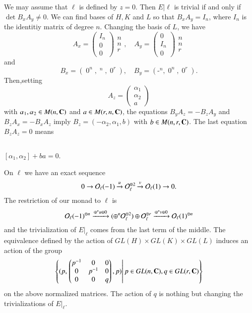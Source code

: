 We may assume that $\ell$ is defined by $z=0$. Then $E |\ell$ is trivial if and only if $\det B_{x}A_{y} \neq 0$. We can find bases of $H, K$ and $L$ so that $B_{x}A_{y} = I_{n}$, where $I_{n}$ is the identitiy matrix of degree $n$. Changing the basis of $L$, we have
$$
A_{x}= \begin{pmatrix}
I_{n}\\
0\\
0
\end{pmatrix}
\begin{matrix}
n\\
n\\
r
\end{matrix}
,\quad
A_{y}=\begin{pmatrix}
0\\
I_{n}\\
0
\end{pmatrix}
\begin{matrix}
n\\
n\\
r
\end{matrix}
$$
and
$$
\displaystyle B_{x}=(\mathop{0}^{n}, \mathop{I_{n}}^{n}, \mathop{0}^{r}), \quad \displaystyle B_{y}=(\mathop{-I_{n}}^{n}, \mathop{0}^{n}, \mathop{0}^{r}).
$$
Then,\pageoriginale setting
$$
A_{z}=\begin{pmatrix}
\alpha_{1}\\
\alpha_{2}\\
a
\end{pmatrix}
$$
with $\alpha_{1} ,\alpha_{2} \in M(n, \mathbf{C})$ and $a \in M(r,n,\mathbf{C})$, the equations $B_{y}A_{z} = -B_{z}A_{y}$ and $B_{z}A_{x} = -B_{x}A_{z}$ imply $B_{z}=(-\alpha_{2}, \alpha_{1},b)$ with $b \in M(n,r,\mathbf{C})$. The last equation $B_{z}A_{z} = 0$ means
 
\setcounter{subsection}{1}
\subsection{}\label{art12-subsec-1.2}
$[\alpha_{1}, \alpha_{2}] + ba =0$.

On $\ell$ we have an exact sequence
$$
0 \rightarrow \mathcal{O}_{\ell}(-1)\xrightarrow{u}\mathcal{O}_{\ell}^{\oplus 2} \xrightarrow{v}\mathcal{O}_{\ell}(1) \rightarrow 0.
$$
The restriction of our monad to $\ell$ is
$$
\mathcal{O}_{\ell}(-1)^{\oplus n} \xrightarrow{\oplus^{n}u\oplus 0}(\oplus^{n}\mathcal{O}_{\ell}^{\oplus 2}) \oplus \mathcal{O}_{\ell}^{\oplus r} \xrightarrow{\oplus^{n}v\oplus 0} \mathcal{O}_{\ell}(1)^{\oplus n}
$$
and the trivialization of $E|_{\ell}$ comes from the last term of the middle. The equivalence defined by the action of $GL(H) \times GL(K) \times GL(L)$ induces an action of the group
$$
\left\{(p,\left. \begin{pmatrix}
p^{-1} & 0 & 0\\
0 & p^{-1} & 0\\
0 &  0 & q
\end{pmatrix}, p) \right| p \in GL(n, \mathbf{C}), q \in GL(r, \mathbf{C})\right\}
$$
on the above normalized matrices. The action of $q$ is nothing but changing the trivializations of $E|_{\ell}$.

